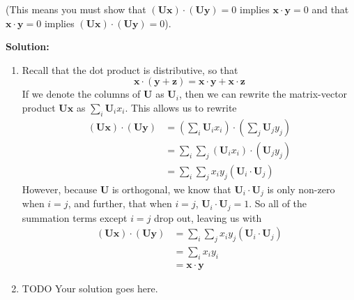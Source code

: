 \documentclass[]{article}
\newcommand{\x}{\bm{x}}					%
\newcommand{\y}{\bm{y}}					%
\newcommand{\solution}{\vskip 0.5cm \textbf{\large Solution:} \\}
\begin{document}
\begin{enumerate}
\begin{enumerate}
		(This means you must show that $(\bm{Ux})\cdot(\bm{Uy}) = 0$ implies $\x\cdot \y=0$ and that $\x\cdot \y=0$ implies $(\bm{Ux})\cdot(\bm{Uy}) = 0$).
	  \end{enumerate}

	  \solution
	  \begin{enumerate}
	  \item Recall that the dot product is distributive, so that
        $$\bm{x} \cdot (\bm{y} + \bm{z}) = \bm{x} \cdot \bm{y} +
        \bm{x} \cdot \bm{z}$$ If we denote the columns of $\bm{U}$ as
        $\bm{U}_i$, then we can rewrite the matrix-vector product
        $\bm{U}\bm{x}$ as $\sum_{i} \bm{U}_i x_i$. This allows us to
        rewrite 
        \[\begin{split}
        (\bm{Ux})\cdot(\bm{Uy}) &= \left(\sum_{i} \bm{U}_i x_i\right) \cdot \left(\sum_{j} \bm{U}_j y_j\right) \\
        &= \sum_{i} \sum_{j} (\bm{U}_i x_i) \cdot (\bm{U}_j y_j) \\
        &= \sum_{i} \sum_{j} x_i y_j (\bm{U}_i \cdot \bm{U}_j)
        \end{split}\]
        However, because $\bm{U}$ is orthogonal, we know that
        $\bm{U}_i \cdot \bm{U}_j$ is only non-zero when $i = j$, and
        further, that when $i = j$, $\bm{U}_i \cdot \bm{U}_j = 1$. So
        all of the summation terms except $i = j$ drop out, leaving us
        with
        \[\begin{split}
        (\bm{Ux})\cdot(\bm{Uy}) &= \sum_{i} \sum_{j} x_i y_j (\bm{U}_i \cdot \bm{U}_j) \\
        &= \sum_{i}  x_i y_i \\
        &= \bm{x} \cdot \bm{y}
        \end{split}\]

      \item TODO Your solution goes here.
	  \end{enumerate}
    \end{enumerate}
\end{document}

